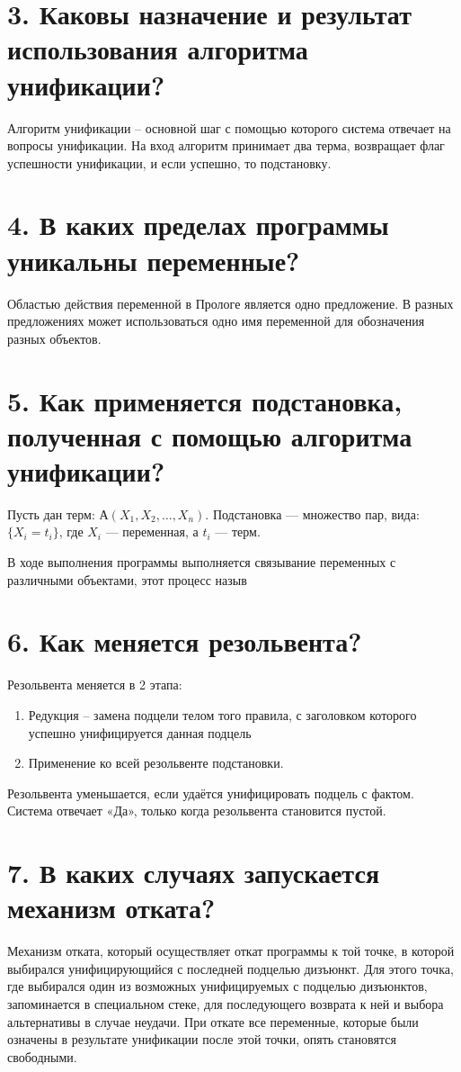 \section*{3. Каковы назначение и результат использования алгоритма унификации?}
Алгоритм унификации – основной шаг с помощью которого система отвечает на вопросы унификации. 
На вход алгоритм принимает два терма, возвращает флаг успешности унификации, и если успешно, то подстановку.

\section*{4. В каких пределах программы уникальны переменные?}
Областью действия переменной в Прологе является одно предложение.
В разных предложениях может использоваться одно имя переменной для обозначения разных объектов.


\section*{5. Как применяется подстановка, полученная с помощью алгоритма унификации?}
Пусть дан терм: $А(X_1, X_2, \ldots , X_n)$.
Подстановка --- множество пар, вида: \\ $\{X _ i = t _ i\}$, где $X_i$ --- переменная, а $t_i$ --- терм.

В ходе выполнения программы выполняется связывание переменных с различными объектами, этот процесс назыв

\section*{6. Как меняется резольвента?}
Резольвента меняется в 2 этапа:
\begin{enumerate}
	\item Редукция – замена подцели телом того правила, с заголовком которого успешно унифицируется данная подцель
	\item Применение ко всей резольвенте подстановки.
\end{enumerate}

Резольвента уменьшается, если удаётся унифицировать подцель с фактом. Система отвечает «Да», только
когда резольвента становится пустой.

\section*{7. В каких случаях запускается механизм отката?}
Механизм отката, который осуществляет откат программы к той точке, в которой выбирался унифицирующийся с последней подцелью дизъюнкт.
Для этого точка, где выбирался один из возможных унифицируемых с подцелью дизъюнктов, запоминается в специальном стеке, для последующего возврата к ней и выбора альтернативы в случае неудачи. 
При откате все переменные, которые были означены в результате унификации после этой точки, опять становятся свободными.